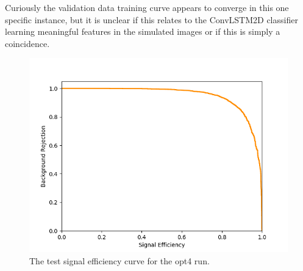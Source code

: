 Curiously the validation data training curve appears to converge in this one specific instance, but it is unclear if this relates to the ConvLSTM2D classifier learning meaningful features in the simulated images or if this is simply a coincidence. 

\begin{figure}[ht] 
        \centering \includegraphics[width=\columnwidth]{figures/crabrun2opt4_sigeff.png}

        \caption{
                \label{fig:opt4_sigeff} The test signal efficiency curve for the opt4 run.
        }
\end{figure}

